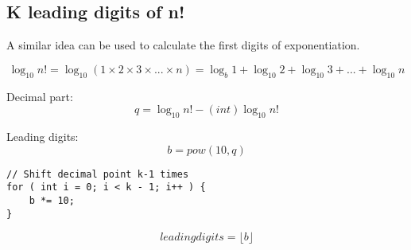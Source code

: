 \subsection{K leading digits of n!}
A similar idea can be used to calculate the first digits of exponentiation.

$$ \log _{10} n! = \log _{10} (1 \times 2 \times 3 \times ... \times n) = \log _{b} 1 + \log _{10} 2 + \log _{10} 3 + ... + \log _{10} n $$

Decimal part:
$$ q = \log _{10} n! - (int) \log_{10} n! $$

Leading digits:
$$ b = pow(10, q) $$
\begin{lstlisting}[style=c++, numbers=none]
// Shift decimal point k-1 times
for ( int i = 0; i < k - 1; i++ ) {
    b *= 10;
}
\end{lstlisting}
$$ leadingdigits = \lfloor b \rfloor $$
